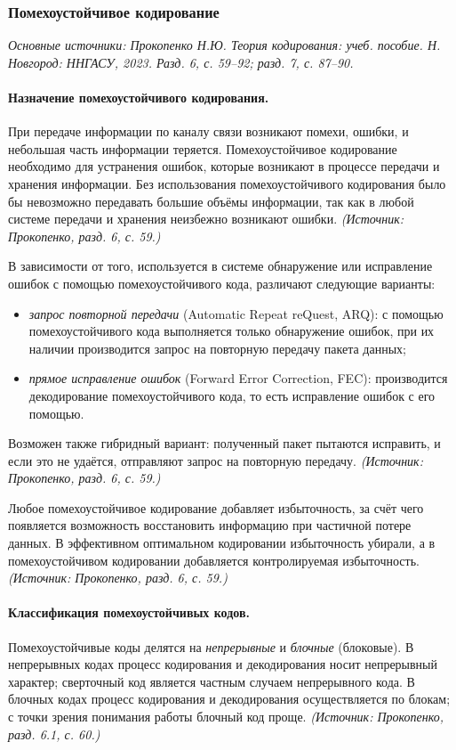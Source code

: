 \documentclass[a4paper,12pt]{article}
\begin{document}
\subsubsection{Помехоустойчивое кодирование}

\noindent\textit{Основные источники: Прокопенко Н.Ю. Теория кодирования: учеб. пособие. Н. Новгород: ННГАСУ, 2023. Разд. 6, с. 59--92; разд. 7, с. 87--90.}

\paragraph{Назначение помехоустойчивого кодирования.}
При передаче информации по каналу связи возникают помехи, ошибки, и небольшая часть информации теряется. Помехоустойчивое кодирование необходимо для устранения ошибок, которые возникают в процессе передачи и хранения информации. Без использования помехоустойчивого кодирования было бы невозможно передавать большие объёмы информации, так как в любой системе передачи и хранения неизбежно возникают ошибки.
\textit{(Источник: Прокопенко, разд. 6, с. 59.)}

В зависимости от того, используется в системе обнаружение или исправление ошибок с помощью помехоустойчивого кода, различают следующие варианты:
\begin{itemize}
\item \emph{запрос повторной передачи} (Automatic Repeat reQuest, ARQ): с помощью помехоустойчивого кода выполняется только обнаружение ошибок, при их наличии производится запрос на повторную передачу пакета данных;
\item \emph{прямое исправление ошибок} (Forward Error Correction, FEC): производится декодирование помехоустойчивого кода, то есть исправление ошибок с его помощью.
\end{itemize}
Возможен также гибридный вариант: полученный пакет пытаются исправить, и если это не удаётся, отправляют запрос на повторную передачу.
\textit{(Источник: Прокопенко, разд. 6, с. 59.)}

Любое помехоустойчивое кодирование добавляет избыточность, за счёт чего появляется возможность восстановить информацию при частичной потере данных. В эффективном оптимальном кодировании избыточность убирали, а в помехоустойчивом кодировании добавляется контролируемая избыточность.
\textit{(Источник: Прокопенко, разд. 6, с. 59.)}

\paragraph{Классификация помехоустойчивых кодов.}
Помехоустойчивые коды делятся на \emph{непрерывные} и \emph{блочные} (блоковые). В непрерывных кодах процесс кодирования и декодирования носит непрерывный характер; сверточный код является частным случаем непрерывного кода. В блочных кодах процесс кодирования и декодирования осуществляется по блокам; с точки зрения понимания работы блочный код проще.
\textit{(Источник: Прокопенко, разд. 6.1, с. 60.)}
\end{document}
